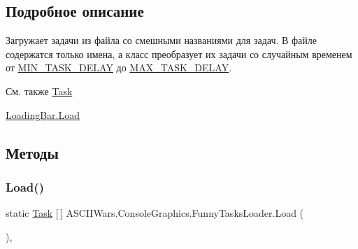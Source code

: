 \subsection{Подробное описание}
Загружает задачи из файла со смешными названиями для задач. В файле содержатся только имена, а класс преобразует их задачи со случайным временем от \hyperlink{class_a_s_c_i_i_wars_1_1_console_graphics_1_1_funny_tasks_loader_a9008864a7b23b6e86b350b5c2097151c}{M\+I\+N\+\_\+\+T\+A\+S\+K\+\_\+\+D\+E\+L\+AY} до \hyperlink{class_a_s_c_i_i_wars_1_1_console_graphics_1_1_funny_tasks_loader_a0c34f365b46e3cc7e9974d5412b05f6c}{M\+A\+X\+\_\+\+T\+A\+S\+K\+\_\+\+D\+E\+L\+AY}. 

\begin{DoxySeeAlso}{См. также}
\hyperlink{class_a_s_c_i_i_wars_1_1_console_graphics_1_1_task}{Task} 

\hyperlink{class_a_s_c_i_i_wars_1_1_console_graphics_1_1_loading_bar_a608770219ead82a4ce54ad22f6c3ba38}{Loading\+Bar.\+Load} 
\end{DoxySeeAlso}


\subsection{Методы}
\hypertarget{class_a_s_c_i_i_wars_1_1_console_graphics_1_1_funny_tasks_loader_a31fd5789c12ebfb455dc594a35a8316c}{}\label{class_a_s_c_i_i_wars_1_1_console_graphics_1_1_funny_tasks_loader_a31fd5789c12ebfb455dc594a35a8316c} 
\subsubsection{\texorpdfstring{Load()}{Load()}}
{\footnotesize\ttfamily static \hyperlink{class_a_s_c_i_i_wars_1_1_console_graphics_1_1_task}{Task} \mbox{[}$\,$\mbox{]} A\+S\+C\+I\+I\+Wars.\+Console\+Graphics.\+Funny\+Tasks\+Loader.\+Load (\begin{DoxyParamCaption}{ }\end{DoxyParamCaption})\hspace{0.3cm}{\ttfamily [inline]}, {\ttfamily [static]}}



